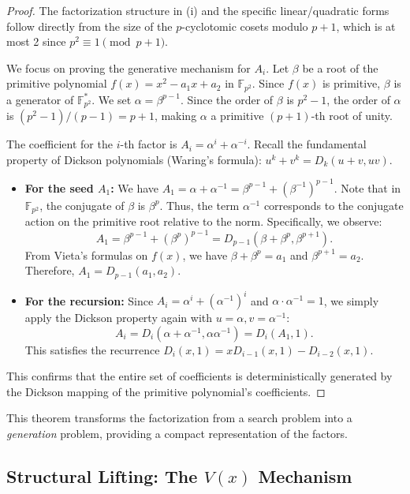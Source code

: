 \documentclass[12pt]{article}
\theoremstyle{plain}
\numberwithin{equation}{section}
\begin{document}
\begin{proof}
The factorization structure in (i) and the specific linear/quadratic forms follow directly from the size of the $p$-cyclotomic cosets modulo $p+1$, which is at most 2 since $p^2 \equiv 1 \pmod{p+1}$.

We focus on proving the generative mechanism for $A_i$. Let $\beta$ be a root of the primitive polynomial $f(x) = x^2 - a_1 x + a_2$ in $\mathbb{F}_{p^2}$. Since $f(x)$ is primitive, $\beta$ is a generator of $\mathbb{F}_{p^2}^*$. We set $\alpha = \beta^{p-1}$. Since the order of $\beta$ is $p^2-1$, the order of $\alpha$ is $(p^2-1)/(p-1) = p+1$, making $\alpha$ a primitive $(p+1)$-th root of unity.

The coefficient for the $i$-th factor is $A_i = \alpha^i + \alpha^{-i}$. Recall the fundamental property of Dickson polynomials (Waring's formula): $u^k + v^k = D_k(u+v, uv)$.
\begin{itemize}
    \item \textbf{For the seed $A_1$:} We have $A_1 = \alpha + \alpha^{-1} = \beta^{p-1} + (\beta^{-1})^{p-1}$. Note that in $\mathbb{F}_{p^2}$, the conjugate of $\beta$ is $\beta^p$. Thus, the term $\alpha^{-1}$ corresponds to the conjugate action on the primitive root relative to the norm. Specifically, we observe:
    $$A_1 = \beta^{p-1} + (\beta^p)^{p-1} = D_{p-1}(\beta+\beta^p, \beta^{p+1}).$$
    From Vieta's formulas on $f(x)$, we have $\beta + \beta^p = a_1$ and $\beta^{p+1} = a_2$. Therefore, $A_1 = D_{p-1}(a_1, a_2)$.
    
    \item \textbf{For the recursion:} Since $A_i = \alpha^i + (\alpha^{-1})^i$ and $\alpha \cdot \alpha^{-1} = 1$, we simply apply the Dickson property again with $u=\alpha, v=\alpha^{-1}$:
    $$A_i = D_i(\alpha + \alpha^{-1}, \alpha \alpha^{-1}) = D_i(A_1, 1).$$
    This satisfies the recurrence $D_i(x, 1) = x D_{i-1}(x, 1) - D_{i-2}(x, 1)$.
\end{itemize}
This confirms that the entire set of coefficients is deterministically generated by the Dickson mapping of the primitive polynomial's coefficients.
\end{proof}

This theorem transforms the factorization from a search problem into a \textit{generation} problem, providing a compact representation of the factors.


\subsection{Structural Lifting: The $V(x)$ Mechanism}
\end{document}
